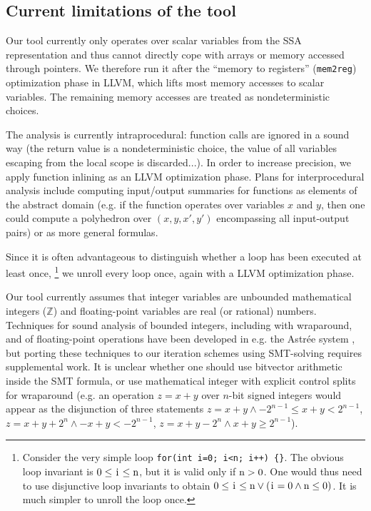 \documentclass{entcs}
\newcommand{\ZZ}{\mathbb{Z}}
\begin{document}
\subsection{Current limitations of the tool}

Our tool currently only operates over scalar variables from the SSA representation and thus cannot directly cope with arrays or memory accessed through pointers. We therefore run it after the ``memory to registers'' (\texttt{mem2reg}) optimization phase in LLVM, which lifts most memory accesses to scalar variables.
The remaining memory accesses are treated as nondeterministic choices.

The analysis is currently intraprocedural: function calls are ignored in a sound way (the return value is a nondeterministic choice, the value of all variables escaping from the local scope is discarded...).
In order to increase precision, we apply function inlining as an LLVM optimization phase.
Plans for interprocedural analysis include computing input/output summaries for functions as elements of the abstract domain (e.g. if the function operates over variables $x$ and $y$, then one could compute a polyhedron over $(x,y,x',y')$ encompassing all input-output pairs) or as more general formulas.

Since it is often advantageous to distinguish whether a loop has been executed at least once,%
\footnote{Consider the very simple loop \lstinline|for(int i=0; i<n; i++) {}|.
The obvious loop invariant is $0 \leq \lstinline|i| \leq \lstinline|n|$, but it is valid only if $\lstinline|n| > 0$.
One would thus need to use disjunctive loop invariants to obtain
$0 \leq \lstinline|i| \leq \lstinline|n| \lor
 (\lstinline|i|=0 \land \lstinline|n| \leq 0)$.
It is much simpler to unroll the loop once.}
we unroll every loop once, again with a LLVM optimization phase.

Our tool currently assumes that integer variables are unbounded mathematical integers ($\ZZ$) and floating-point variables are real (or rational) numbers. Techniques for sound analysis of bounded integers, including with wraparound, and of floating-point operations have been developed in e.g. the Astr\'ee system \citep{ASTREE_ESOP05,ASTREE_PLDI03}, but porting these techniques to our iteration schemes using SMT-solving requires supplemental work.
It is unclear whether one should use bitvector arithmetic inside the SMT formula, or use mathematical integer with explicit control splits for wraparound (e.g. an operation $z = x+y$ over $n$-bit signed integers would appear as the disjunction of three statements $z = x+y \land -2^{n-1} \leq x+y < 2^{n-1}$,
$z = x+y+2^n \land -x+y < -2^{n-1}$,
$z = x+y-2^n \land x+y \geq 2^{n-1}$).
\end{document}
